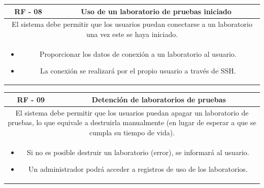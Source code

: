                 \begin{table}[!htbp]
                    \centering

                    \begin{tabular}{|c|c|}
                        \hline
                        \textbf{RF - 08} & \textbf{Uso de un laboratorio de pruebas iniciado} \\
                        \hline
                        \multicolumn{2}{|p{15cm}|}{
                            El sistema debe permitir que los usuarios puedan conectarse a un laboratorio una vez este se haya iniciado.
                        } \\
                        \hline
                        \multicolumn{2}{|p{15cm}|}{
                            \begin{itemize}
                                \item Proporcionar los datos de conexión a un laboratorio al usuario.
                                \item La conexión se realizará por el propio usuario a través de SSH.
                            \end{itemize}
                            } \\
                        \hline
                    \end{tabular}

                    \label{tab:RF8}
                \end{table}
                
                \begin{table}[!htbp]
                    \centering

                    \begin{tabular}{|c|c|}
                        \hline
                        \textbf{RF - 09} & \textbf{Detención de laboratorios de pruebas} \\
                        \hline
                        \multicolumn{2}{|p{15cm}|}{
                            El sistema debe permitir que los usuarios puedan apagar un laboratorio de pruebas, lo que equivale a destruirla manualmente (en lugar de esperar a que se cumpla su tiempo de vida).
                        } \\
                        \hline
                        \multicolumn{2}{|p{15cm}|}{
                            \begin{itemize}
                                \item Si no es posible destruir un laboratorio (error), se informará al usuario.
                                \item Un administrador podrá acceder a registros de uso de los laboratorios.
                            \end{itemize}
                            } \\
                        \hline
                    \end{tabular}

                    \label{tab:RF09}
                \end{table}
                

